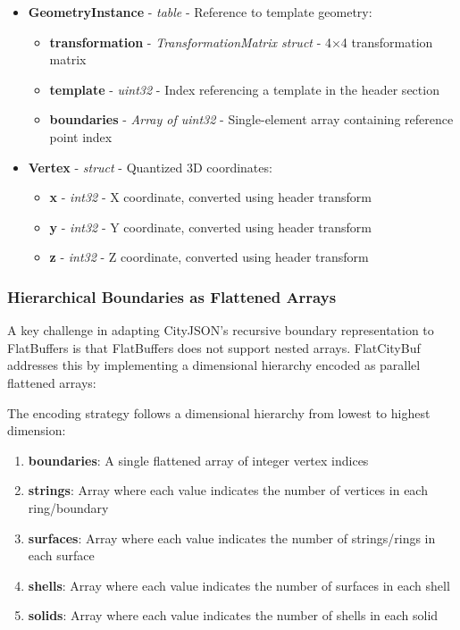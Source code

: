 \begin{itemize}
  \item \textbf{GeometryInstance} - \textit{table} - Reference to template geometry:
    \begin{itemize}
      \item \textbf{transformation} - \textit{TransformationMatrix struct} - 4×4 transformation matrix
      \item \textbf{template} - \textit{uint32} - Index referencing a template in the header section
      \item \textbf{boundaries} - \textit{Array of uint32} - Single-element array containing reference point index
    \end{itemize}

  \item \textbf{Vertex} - \textit{struct} - Quantized 3D coordinates:
    \begin{itemize}
      \item \textbf{x} - \textit{int32} - X coordinate, converted using header transform
      \item \textbf{y} - \textit{int32} - Y coordinate, converted using header transform
      \item \textbf{z} - \textit{int32} - Z coordinate, converted using header transform
    \end{itemize}
\end{itemize}

\subsubsection{Hierarchical Boundaries as Flattened Arrays}
\label{methodology:feature_encoding:geometry_encoding:flattened_arrays}

A key challenge in adapting CityJSON's recursive boundary representation to FlatBuffers is that FlatBuffers does not support nested arrays. FlatCityBuf addresses this by implementing a dimensional hierarchy encoded as parallel flattened arrays:

The encoding strategy follows a dimensional hierarchy from lowest to highest dimension:

\begin{enumerate}
  \item \textbf{boundaries}: A single flattened array of integer vertex indices
  \item \textbf{strings}: Array where each value indicates the number of vertices in each ring/boundary
  \item \textbf{surfaces}: Array where each value indicates the number of strings/rings in each surface
  \item \textbf{shells}: Array where each value indicates the number of surfaces in each shell
  \item \textbf{solids}: Array where each value indicates the number of shells in each solid
\end{enumerate}

